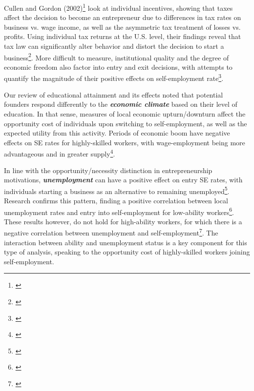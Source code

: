 Cullen and Gordon (2002)\footnote{\cite{CullenGordon2002}} look at individual incentives, showing that taxes affect the decision to become an entrepreneur due to differences in tax rates on business vs. wage income, as well as the asymmetric tax treatment of losses vs. profits. Using individual tax returns at the U.S. level, their findings reveal that tax law can significantly alter behavior and distort the decision to start a business\footnote{\cite{CullenGordon2002}}. More difficult to measure, institutional quality and the degree of economic freedom also factor into entry and exit decisions, with attempts to quantify the magnitude of their positive effects on self-employment rate\footnote{\cite{Williams2013}}.

Our review of educational attainment and its effects noted that potential founders respond differently to the \textbf{\textit{economic climate}} based on their level of education. In that sense, measures of local economic upturn/downturn affect the opportunity cost of individuals upon switching to self-employment, as well as the expected utility from this activity. Periods of economic boom have negative effects on SE rates for highly-skilled workers, with wage-employment being more advantageous and in greater supply\footnote{\cite{kangasharju2001regional}}. 

In line with the opportunity/necessity distinction in entrepreneurship motivations, \textbf{\textit{unemployment}} can have a positive effect on entry SE rates, with individuals starting a business as an alternative to remaining unemployed\footnote{\cite{Deli2011}}. Research confirms this pattern, finding a positive correlation between local unemployment rates and entry into self-employment for low-ability workers\footnote{\cite{Deli2011}}. These results however, do not hold for high-ability workers, for which there is a negative correlation between unemployment and self-employment\footnote{\cite{Deli2011}}. The interaction between ability and unemployment status is a key component for this type of analysis, speaking to the opportunity cost of highly-skilled workers joining self-employment. 













